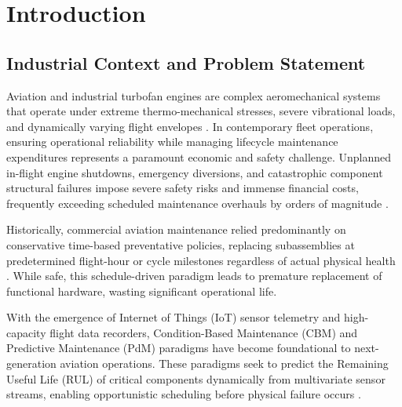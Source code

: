 \chapter{Introduction}
\label{chap:introduction}

\section{Industrial Context and Problem Statement}
Aviation and industrial turbofan engines are complex aeromechanical systems that operate under extreme thermo-mechanical stresses, severe vibrational loads, and dynamically varying flight envelopes \cite{saxena2008damage}. In contemporary fleet operations, ensuring operational reliability while managing lifecycle maintenance expenditures represents a paramount economic and safety challenge. Unplanned in-flight engine shutdowns, emergency diversions, and catastrophic component structural failures impose severe safety risks and immense financial costs, frequently exceeding scheduled maintenance overhauls by orders of magnitude \cite{chen2022data}.

Historically, commercial aviation maintenance relied predominantly on conservative time-based preventative policies, replacing subassemblies at predetermined flight-hour or cycle milestones regardless of actual physical health \cite{shehadeh2024evaluating}. While safe, this schedule-driven paradigm leads to premature replacement of functional hardware, wasting significant operational life. 

With the emergence of Internet of Things (IoT) sensor telemetry and high-capacity flight data recorders, Condition-Based Maintenance (CBM) and Predictive Maintenance (PdM) paradigms have become foundational to next-generation aviation operations. These paradigms seek to predict the Remaining Useful Life (RUL) of critical components dynamically from multivariate sensor streams, enabling opportunistic scheduling before physical failure occurs \cite{huang2021survey}.

